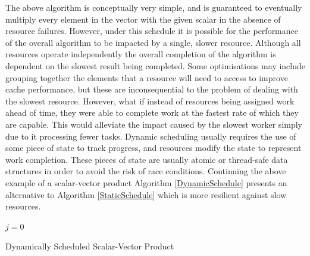 \documentclass[12pt]{article}
\begin{document}
The above algorithm is conceptually very simple, and is guaranteed to eventually multiply every element in the vector with the given scalar in the absence of resource failures. 
\newline
However, under this schedule it is possible for the performance of the overall algorithm to be impacted by a single, slower resource. Although all resources operate independently the overall completion of the algorithm is dependent on the slowest result being completed. 
\newline
Some optimisations may include grouping together the elements that a resource will need to access to improve cache performance, but these are inconsequential to the problem of dealing with the slowest resource.
\newline
However, what if instead of resources being assigned work ahead of time, they were able to complete work at the fastest rate of which they are capable. This would alleviate the impact caused by the slowest worker simply due to it processing fewer tasks.
\newline
\newline
Dynamic scheduling usually requires the use of some piece of state to track progress, and resources modify the state to represent work completion. These pieces of state are usually atomic or thread-safe data structures in order to avoid the risk of race conditions.
\newline
Continuing the above example of a scalar-vector product Algorithm \ref{DynamicSchedule} presents an alternative to Algorithm \ref{StaticSchedule} which is more resilient against slow resources.
\newline

\IncMargin{1em}
\begin{algorithm}[H]
 \BlankLine
 
 $j = 0$\;
 \caption{Dynamically Scheduled Scalar-Vector Product}
 \label{DynamicSchedule}
\end{algorithm}
\DecMargin{1em}
\medskip
\end{document}
